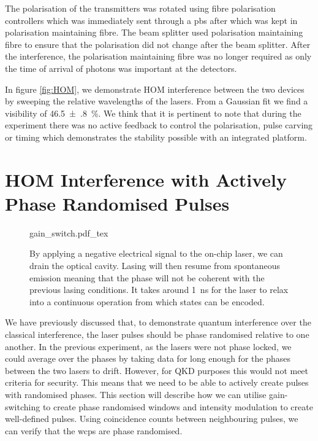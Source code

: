 The polarisation of the transmitters was rotated using fibre polarisation controllers which was immediately sent through a \ac{pbs} after which was kept in polarisation maintaining fibre. The beam splitter used polarisation maintaining fibre to ensure that the polarisation did not change after the beam splitter. After the interference, the polarisation maintaining fibre was no longer required as only the time of arrival of photons was important at the detectors.

In figure \ref{fig:HOM}, we demonstrate \acl{HOM} interference between the two devices by sweeping the relative wavelengths of the lasers. From a Gaussian fit we find a visibility of \SI{46.5(8)}{\percent}. We think that it is pertinent to note that during the experiment there was no active feedback to control the polarisation, pulse carving or timing which demonstrates the stability possible with an integrated platform. 

\section{HOM Interference with Actively Phase Randomised Pulses}

\begin{figure}[tp]
	\centering
	\def\svgwidth{0.8\textwidth} 
	{gain_switch.pdf_tex}
	\caption[Gain switching of the on-chip lasers at \SI{250}{MHz}]{By applying a negative electrical signal to the on-chip laser, we can drain the optical cavity. Lasing will then resume from spontaneous emission meaning that the phase will not be coherent with the previous lasing conditions. It takes around \SI{1}{\ns} for the laser to relax into a continuous operation from which states can be encoded.}
	\label{fig:gain_switch}
\end{figure}

We have previously discussed that, to demonstrate quantum interference over the classical interference, the laser pulses should be phase randomised relative to one another. In the previous experiment, as the lasers were not phase locked, we could average over the phases by taking data for long enough for the phases between the two lasers to drift. However, for \ac{QKD} purposes this would not meet criteria for security. This means that we need to be able to actively create pulses with randomised phases. This section will describe how we can utilise gain-switching to create phase randomised windows and intensity modulation to create well-defined pulses. Using coincidence counts between neighbouring pulses, we can verify that the  \acp{wcp} are phase randomised.

